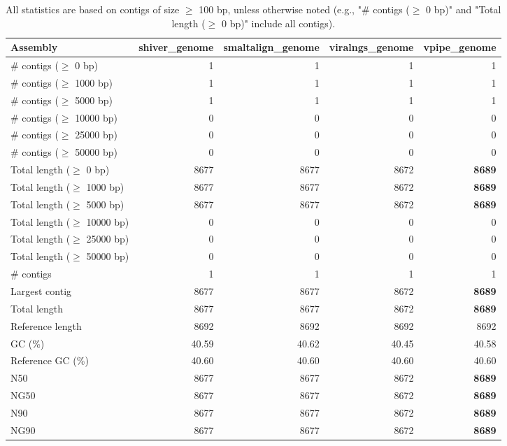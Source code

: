 \documentclass[12pt,a4paper]{article}
\begin{document}
\begin{table}[ht]
\begin{center}
\caption{All statistics are based on contigs of size $\geq$ 100 bp, unless otherwise noted (e.g., "\# contigs ($\geq$ 0 bp)" and "Total length ($\geq$ 0 bp)" include all contigs).}
\begin{tabular}{|l*{4}{|r}|}
\hline
Assembly & shiver\_genome & smaltalign\_genome & viralngs\_genome & vpipe\_genome \\ \hline
\# contigs ($\geq$ 0 bp) & 1 & 1 & 1 & 1 \\ \hline
\# contigs ($\geq$ 1000 bp) & 1 & 1 & 1 & 1 \\ \hline
\# contigs ($\geq$ 5000 bp) & 1 & 1 & 1 & 1 \\ \hline
\# contigs ($\geq$ 10000 bp) & 0 & 0 & 0 & 0 \\ \hline
\# contigs ($\geq$ 25000 bp) & 0 & 0 & 0 & 0 \\ \hline
\# contigs ($\geq$ 50000 bp) & 0 & 0 & 0 & 0 \\ \hline
Total length ($\geq$ 0 bp) & 8677 & 8677 & 8672 & {\bf 8689} \\ \hline
Total length ($\geq$ 1000 bp) & 8677 & 8677 & 8672 & {\bf 8689} \\ \hline
Total length ($\geq$ 5000 bp) & 8677 & 8677 & 8672 & {\bf 8689} \\ \hline
Total length ($\geq$ 10000 bp) & 0 & 0 & 0 & 0 \\ \hline
Total length ($\geq$ 25000 bp) & 0 & 0 & 0 & 0 \\ \hline
Total length ($\geq$ 50000 bp) & 0 & 0 & 0 & 0 \\ \hline
\# contigs & 1 & 1 & 1 & 1 \\ \hline
Largest contig & 8677 & 8677 & 8672 & {\bf 8689} \\ \hline
Total length & 8677 & 8677 & 8672 & {\bf 8689} \\ \hline
Reference length & 8692 & 8692 & 8692 & 8692 \\ \hline
GC (\%) & 40.59 & 40.62 & 40.45 & 40.58 \\ \hline
Reference GC (\%) & 40.60 & 40.60 & 40.60 & 40.60 \\ \hline
N50 & 8677 & 8677 & 8672 & {\bf 8689} \\ \hline
NG50 & 8677 & 8677 & 8672 & {\bf 8689} \\ \hline
N90 & 8677 & 8677 & 8672 & {\bf 8689} \\ \hline
NG90 & 8677 & 8677 & 8672 & {\bf 8689} \\ \hline

\end{tabular}
\end{center}
\end{table}
\end{document}
